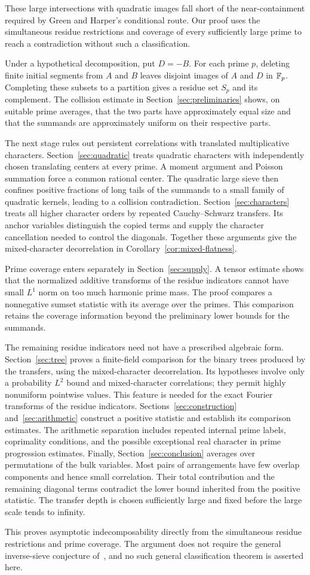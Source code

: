 These large intersections with quadratic images fall short of the
near-containment required by Green and Harper's conditional route.
Our proof uses the simultaneous residue
restrictions and coverage of every sufficiently large prime to reach a
contradiction without such a classification.

Under a hypothetical decomposition,
put $D=-B$.  For each prime $p$, deleting finite initial segments from
$A$ and $B$ leaves disjoint images of $A$ and $D$ in $\mathbb F_p$.
Completing these subsets
to a partition gives a residue set $S_p$ and its complement.  The
collision estimate in Section~\ref{sec:preliminaries} shows, on suitable
prime averages, that the two parts have approximately equal size and
that the summands are approximately uniform on their respective parts.

The next stage rules out persistent correlations with translated
multiplicative characters.  Section~\ref{sec:quadratic} treats quadratic
characters with independently chosen translating centers at every
prime.  A moment argument and Poisson summation force a common rational
center. The quadratic large sieve then confines positive fractions of
long tails of the summands to a small family of quadratic
kernels, leading to a collision contradiction.  Section~\ref{sec:characters} treats all higher character
orders by repeated Cauchy--Schwarz transfers.  Its anchor variables
distinguish the copied terms and supply the character cancellation
needed to control the diagonals.  Together these arguments give the
mixed-character decorrelation in Corollary~\ref{cor:mixed-flatness}.

Prime coverage enters separately in Section~\ref{sec:supply}.  A tensor
estimate shows that the normalized additive transforms of the residue
indicators cannot have small $L^1$ norm on too much harmonic prime
mass.  The proof compares a nonnegative sumset statistic with its
average over the primes.  This comparison retains the coverage
information beyond the preliminary lower bounds for the summands.

The remaining residue indicators need not have a prescribed algebraic
form.  Section~\ref{sec:tree} proves a finite-field comparison for the
binary trees produced by the transfers, using the mixed-character
decorrelation. Its hypotheses involve only a probability $L^2$ bound
and mixed-character correlations; they permit highly nonuniform
pointwise values. This feature is needed for the exact Fourier
transforms of the residue indicators.  Sections~\ref{sec:construction} and~\ref{sec:arithmetic}
construct a positive statistic and establish its comparison estimates.
The arithmetic separation includes repeated internal prime labels,
coprimality conditions, and the possible exceptional real character
in prime progression estimates.  Finally, Section~\ref{sec:conclusion}
averages over permutations of the bulk variables.  Most pairs of arrangements have few overlap components and hence
small correlation. Their total contribution and the remaining diagonal
terms contradict the lower bound inherited from the positive statistic.
The transfer depth is chosen sufficiently large and fixed before the
large scale tends to infinity.

This proves asymptotic indecomposability directly from the simultaneous
residue restrictions and prime coverage.  The argument does not require
the general inverse-sieve conjecture of~\cite{GreenHarper}, and no such
general classification theorem is asserted here.
